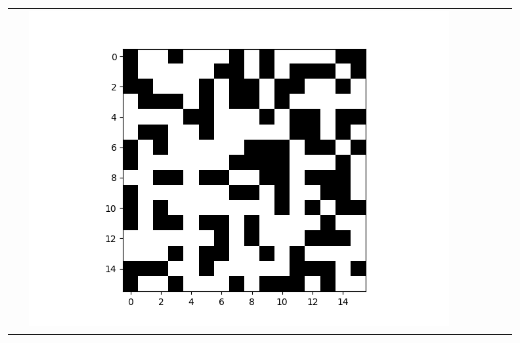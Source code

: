 \documentclass[12pt]{report}
\begin{document}
\begin{table}[H]
\begin{tabular}{  c  c  c  c  c  c }
\begin{minipage}{.15\textwidth}
    \end{minipage} &
    \begin{minipage}{.15\textwidth}
      \includegraphics[scale=0.2]{BM_fhidden.png}
    \end{minipage}
  \end{tabular}
\end{table}
\end{document}
